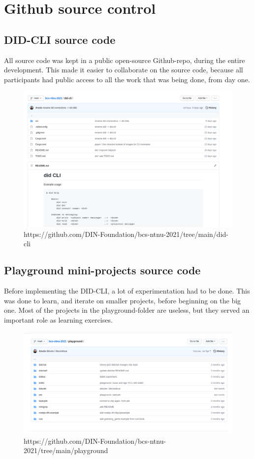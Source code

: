 \newpage

\section{Github source control}
\subsection{DID-CLI source code} 

All source code was kept in a public open-source Github-repo, during the entire development. This made it easier to 
collaborate on the source code, because all participants had public access to all the work that was being done, from day one.

    \begin{figure}[htbp]
      \centering
      \includegraphics[width=.7\textwidth]{figures/github-implementation}
      \caption[DID CLI]{https://github.com/DIN-Foundation/bcs-ntnu-2021/tree/main/did-cli}
    \end{figure}
    
    
\subsection{Playground mini-projects source code}

Before implementing the DID-CLI, a lot of experimentation had to be done. This was done to learn, and iterate on smaller projects, before beginning on the big one. Most of the projects in the playground-folder are useless, but they served an important role as learning exercises.
    
    \begin{figure}[htbp]
      \centering
      \includegraphics[width=.7\textwidth]{figures/github-playground}
      \caption[Playground]{https://github.com/DIN-Foundation/bcs-ntnu-2021/tree/main/playground}
    \end{figure}

